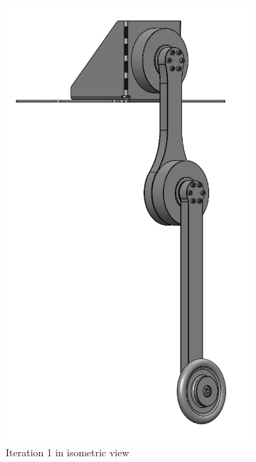 \begin{figure}[H]
    \centering
    \begin{subfigure}[b]{0.3\textwidth}
        \includegraphics[width=\textwidth]{figures/hardware_setup/double_pendulum_it1_v1.png}
        \caption{Iteration 1 in isometric view}
        \label{fig:image1}
    \end{subfigure}
    \hfill
    \begin{subfigure}[b]{0.3\textwidth}

\end{subfigure}
\end{figure}
